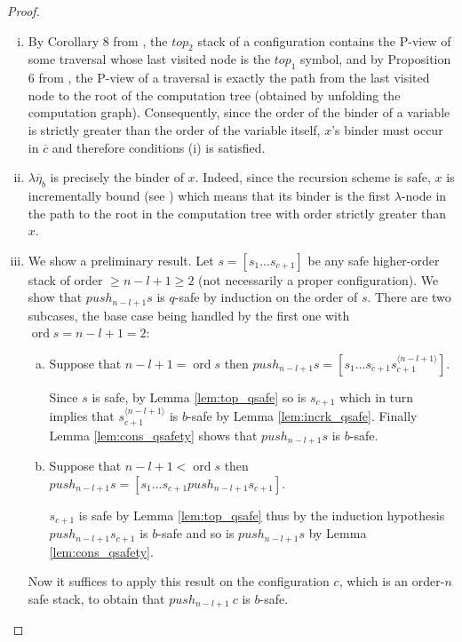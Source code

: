 \documentclass{article}
\newcommand{\ord}{\mathop{\mathrm{ord}}}
\theoremstyle{remark}
\theoremstyle{definition}
\newcommand\orddec\overline
\begin{document}
\begin{proof}
\begin{enumerate}[i.]
\item By Corollary 8 from \cite{hague-sto07}, the $top_2$
     stack of a configuration contains the P-view of some
    traversal whose last visited node is the $top_1$ symbol, and
    by Proposition 6 from \cite{OngLics2006}, the P-view of a
    traversal is exactly the path from the last visited node to
    the root of the computation tree (obtained by unfolding the
    computation graph). Consequently, since the order of the
    binder of a variable is strictly greater than the order of
    the variable itself, $x$'s binder must occur in $\orddec{c}$
    and therefore conditions (i) is satisfied.

\item $\lambda \overline{\eta}_{b}$ is precisely the binder of $x$.
    Indeed, since the recursion scheme is safe, $x$ is
 incrementally bound (see \cite{blumong:safelambdacalculus})
 which means that its binder is the first $\lambda$-node in the
 path to the root in the computation tree with order strictly
 greater than $x$.

\item We show a preliminary result.
    Let $s=[s_1 \ldots s_{c+1}]$ be any safe higher-order stack of order
    $\geq n-l+1 \geq 2$ (not necessarily a proper configuration). We
    show that $push_{n-l+1} s$ is $q$-safe by induction on the order of
    $s$. There are two subcases, the base case being handled by the
    first one with $\ord{s} = n-l+1 = 2$:
    \begin{enumerate}[a.]
      \item Suppose that $n-l+1 = \ord{s}$ then
    $push_{n-l+1} s = [ s_1 \ldots s_{c+1} s_{c+1}^{\langle n-l+1
    \rangle}]$.

    Since $s$ is safe, by Lemma \ref{lem:top_qsafe} so is $s_{c+1}$
    which in turn implies that $s_{c+1}^{\langle n-l+1\rangle}$ is
    $b$-safe by Lemma \ref{lem:incrk_qsafe}. Finally Lemma
    \ref{lem:cons_qsafety} shows that  $push_{n-l+1} s$ is $b$-safe.

      \item Suppose that $n-l+1 < \ord{s}$ then
    $push_{n-l+1} s = [ s_1 \ldots s_{c+1} push_{n-l+1} s_{c+1}]$.

    $s_{c+1}$ is safe by Lemma \ref{lem:top_qsafe} thus by the
    induction hypothesis $push_{n-l+1} s_{c+1}$ is $b$-safe and so
    is $push_{n-l+1} s$ by Lemma \ref{lem:cons_qsafety}.
        \end{enumerate}
    Now it suffices to apply this result on the configuration $c$, which
    is an order-$n$ safe stack, to obtain that $push_{n-l+1}\ c$ is
    $b$-safe.
\end{enumerate}
\end{proof}
\end{document}
